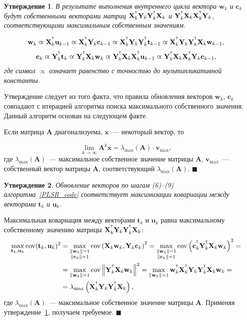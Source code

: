 \documentclass[12pt,twoside]{article}
\newtheorem{statement}{Утверждение}
\newcommand{\bx}{\mathbf{x}}
\newcommand{\bw}{\mathbf{w}}
\newcommand{\bY}{\mathbf{Y}}
\newcommand{\bX}{\mathbf{X}}
\newcommand{\bu}{\mathbf{u}}
\newcommand{\bt}{\mathbf{t}}
\newcommand{\bc}{\mathbf{c}}
\newcommand{\T}{^{\text{\tiny\sffamily\upshape\mdseries T}}}
\begin{document}
\begin{statement}
	В результате выполнения внутреннего цикла вектора $\bw_k$ и $\bc_k$ будут собственными векторами матриц $\bX_k^{\T} \bY_k \bY_k^{\T} \bX_k$ и $\bY_k^{\T} \bX_k \bX_k^{\T} \bY_k$, соответствующими максимальным собственным значениям.
	
	\begin{equation*}
	\bw_k \varpropto \bX_k^{\T} \bu_{k-1} \varpropto \bX_k^{\T} \bY_k \bc_{k-1} \varpropto \bX_k^{\T} \bY_k \bY_k^{\T} \bt_{k-1} \varpropto \bX_k^{\T} \bY_k \bY_k^{\T} \bX_k \bw_{k-1},
	\end{equation*}
	\begin{equation*}
	\bc_k \varpropto \bY_k^{\T} \bt_k \varpropto \bY_k^{\T} \bX_k \bw_k \varpropto \bY_k^{\T} \bX_k \bX_k^{\T} \bu_{k-1} \varpropto \bY_k^{\T} \bX_k \bX_k^{\T} \bY_k \bc_{k-1},
	\end{equation*}
	где символ $\varpropto$ означает равенство с точностью до мультипликативной константы. 
	\label{st::eig}
\end{statement}

Утверждение следует из того факта, что правила обновления векторов $\bw_k$, $\bc_k$ совпадают с итерацией алгоритма поиска максимального собственного значения. Данный алгоритм основан на следующем факте.

Если матрица $\mathbf{A}$ диагонализуема, $\bx$~--- некоторый вектор, то

\[
	\lim_{k \rightarrow \infty} \mathbf{A}^k \bx = \lambda_{\max}(\mathbf{A}) \cdot \mathbf{v}_{\max},
\]
где $ \lambda_{\max} (\mathbf{A})$~--- максимальное собственное значение матрицы $\mathbf{A}$, $\mathbf{v}_{\max}$~---собственный вектор матрицы $\mathbf{A}$, соответствующий $ \lambda_{\max} (\mathbf{A})$.
$\blacksquare$

\begin{statement}
Обновление векторов по шагам (6)--(9) алгоритма~\ref{PLSR_code} соответствует максимизации ковариации между векторами $\bt_k$ и $\bu_k$.
\end{statement}
Максимальная ковариация между векторами $\bt_k$ и $\bu_k$ равна максимальному собственному значению матрицы $\bX_k^{\T} \bY_k \bY_k^{\T} \bX_k$:
\begin{align*}
\max_{\bt_k, \bu_k}  \text{cov} (\bt_k, \bu_k)^2 &= \max_{\substack{\|\bw_k\|=1 \\ \|\bc_k\| = 1}} \text{cov} \left( \bX_k \bw_k, \bY_k \bc_k \right)^2 = \max_{\substack{\|\bw_k\|=1 \\ \|\bc_k\| = 1}} \text{cov} \left(\bc_k^{\T}  \bY_k^{\T} \bX_k \bw_k \right)^2 = \\
&= \max_{\|\bw_k\| = 1} \text{cov} \left\|\bY_k^{\T} \bX_k \bw_k \right\|^2 = \max_{\|\bw_k\| = 1} \bw_k^{\T} \bX_k^{\T} \bY_k \bY_k^{\T} \bX_k \bw_k = \\
& = \lambda_{\max} \left( \bX_k^{\T} \bY_k \bY_k^{\T} \bX_k \right),
\end{align*}
где $ \lambda_{\max} (\mathbf{A})$~--- максимальное собственное значение матрицы $\mathbf{A}$.
Применяя утверждение~\ref{st::eig}, получаем требуемое.
$\blacksquare$
\end{document}
